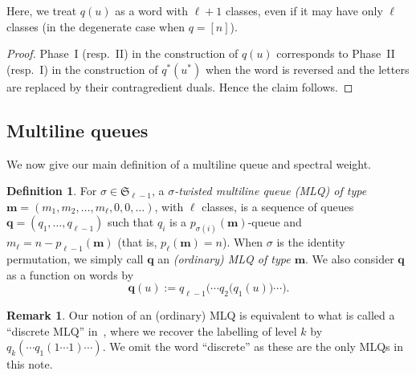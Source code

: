 \documentclass[reqno]{amsart}%
\newcommand{\0}{\phantom{c}}
\DeclareMathOperator{\inter}{int}
\theoremstyle{plain}
\theoremstyle{definition}
\newtheorem{dfn}[thm]{Definition}
\newtheorem{remark}[thm]{Remark}
\numberwithin{equation}{section}
\begin{document}
Here, we treat $q(u)$ as a word with $\ell+1$ classes, even if it may have
only $\ell$ classes (in the degenerate case when $q = \left[  n \right]  $).

\begin{proof}
Phase~I (resp.~II) in the construction of $q(u)$ corresponds to Phase~II
(resp.~I) in the construction of $q^{*}(u^{*})$ when the word is reversed and
the letters are replaced by their contragredient duals. Hence the claim follows.
\end{proof}





\subsection{Multiline queues}

We now give our main definition of a multiline queue and spectral weight.

\begin{dfn}
For $\sigma\in\mathfrak{S}_{\ell-1}$, a {\color{darkred}\emph{$\sigma$-twisted
multiline queue (MLQ) of type $\mathbf{m} = \left(  m_{1}, m_{2}, \ldots,
m_{\ell}, 0, 0, \ldots\right)  $}}, with $\ell$ classes, is a sequence of
queues $\mathbf{q} = (q_{1}, \dotsc, q_{\ell-1})$ such that $q_{i}$ is a
$p_{\sigma(i)}(\mathbf{m})$-queue and $m_{\ell} = n - p_{\ell-1}(\mathbf{m})$
(that is, $p_{\ell}(\mathbf{m}) = n$). When $\sigma$ is the identity
permutation, we simply call $\mathbf{q}$ an {\color{darkred}\emph{(ordinary)
MLQ of type $\mathbf{m}$}}. We also consider $\mathbf{q}$ as a function on
words by
\[
\mathbf{q}(u) := q_{\ell-1}\bigl( \cdots q_{2}\bigl( q_{1}(u) \bigr) \cdots
\bigr).
\]

\end{dfn}

\begin{remark}
Our notion of an (ordinary) MLQ is equivalent to what is called a ``discrete
MLQ'' in~\cite[\S 2.2]{AasLin17}, where we recover the labelling of level $k$
by $q_{k}( \cdots q_{1}(1 \dotsm1) \cdots)$. We omit the word ``discrete'' as
these are the only MLQs in this note.
\end{remark}
\end{document}
